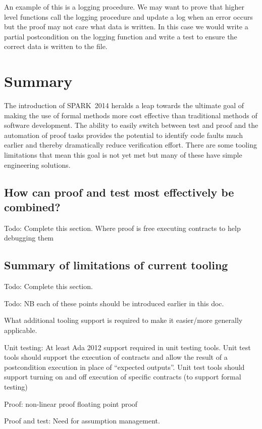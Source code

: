 \documentclass{llncs}
\newcommand{\newspark}{SPARK~2014\xspace}
\begin{document}
An example of this is a logging procedure. We may want to prove that
higher level functions call the logging procedure and update a log
when an error occurs but the proof may not care what data is
written. In this case we would write a partial postcondition on the
logging function and write a test to ensure the correct data is
written to the file.

\section{Summary}

The introduction of \newspark heralds a leap towards the ultimate goal
of making the use of formal methods more cost effective than
traditional methods of software development. The ability to easily
switch between test and proof and the automation of proof tasks
provides the potential to identify code faults much earlier and
thereby dramatically reduce verification effort. There are some
tooling limitations that mean this goal is not yet met but many of
these have simple engineering solutions.

\subsection{How can proof and test most effectively be combined?}
Todo: Complete this section. Where proof is free executing contracts
to help debugging them

\subsection{Summary of limitations of current tooling}

Todo: Complete this section.

Todo: NB each of these points should be introduced earlier in this
doc.

What additional tooling support is required to make it easier/more
generally applicable.

Unit testing: At least Ada 2012 support required in unit testing
tools. Unit test tools should support the execution of contracts and
allow the result of a postcondition execution in place of ``expected
outputs''. Unit test tools should support turning on and off execution
of specific contracts (to support formal testing)

Proof: non-linear proof floating point proof

Proof and test: Need for assumption management.



\end{document}
